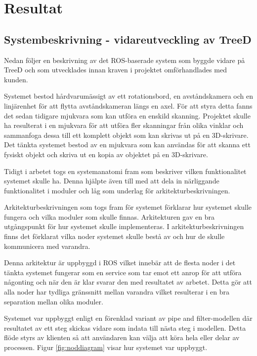 \chapter{Resultat}
\label{cha:results}

\section{Systembeskrivning - vidareutveckling av TreeD}

Nedan följer en beskrivning av det ROS-baserade system som byggde vidare på TreeD och som utvecklades innan kraven i projektet omförhandlades med kunden.

Systemet bestod hårdvarumässigt av ett rotationsbord, en avståndskamera och en linjärenhet för att flytta avståndskameran längs en axel. För att styra detta fanns det sedan tidigare mjukvara som kan utföra en enskild skanning. Projektet skulle ha resulterat i en mjukvara för att utföra fler skanningar från olika vinklar och sammanfoga dessa till ett komplett objekt som kan skrivas ut på en 3D-skrivare. Det tänkta systemet bestod av en mjukvara som kan användas för att skanna ett fysiskt objekt och skriva ut en kopia av objektet på en 3D-skrivare.

Tidigt i arbetet togs en systemanatomi fram som beskriver vilken funktionalitet systemet skulle ha. Denna hjälpte även till med att dela in närliggande funktionalitet i moduler och låg som underlag för arkitekturbeskrivningen.

Arkitekturbeskrivningen som togs fram för systemet förklarar hur systemet skulle fungera och vilka moduler som skulle finnas. Arkitekturen gav en bra utgångspunkt för hur systemet skulle implementeras. I arkitekturbeskrivningen finns det förklarat vilka noder systemet skulle bestå av och hur de skulle kommunicera med varandra.

Denna arkitektur är uppbyggd i ROS vilket innebär att de flesta noder i det tänkta systemet fungerar som en service som tar emot ett anrop för att utföra någonting och när den är klar svarar den med resultatet av arbetet. Detta gör att alla noder har tydliga gränssnitt mellan varandra vilket resulterar i en bra separation mellan olika moduler.

Systemet var uppbyggt enligt en förenklad variant av pipe and filter-modellen där resultatet av ett steg skickas vidare som indata till nästa steg i modellen. Detta flöde styrs av klienten så att användaren kan välja att köra hela eller delar av processen. Figur \ref{fig:noddiagram} visar hur systemet var uppbyggt.


